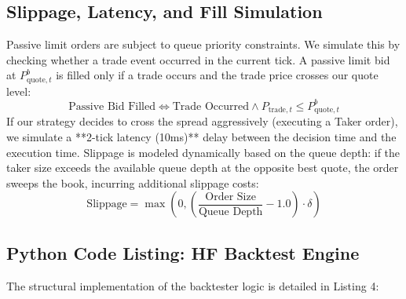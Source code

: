 \documentclass[11pt,a4paper]{article}
\begin{document}
\subsection{Slippage, Latency, and Fill Simulation}
Passive limit orders are subject to queue priority constraints. We simulate this by checking whether a trade event occurred in the current tick. A passive limit bid at $P_{\text{quote}, t}^b$ is filled only if a trade occurs and the trade price crosses our quote level:
\begin{equation}
    \text{Passive Bid Filled} \iff \text{Trade Occurred} \land P_{\text{trade}, t} \leq P_{\text{quote}, t}^b
\end{equation}
If our strategy decides to cross the spread aggressively (executing a Taker order), we simulate a **2-tick latency (10ms)** delay between the decision time and the execution time. Slippage is modeled dynamically based on the queue depth: if the taker size exceeds the available queue depth at the opposite best quote, the order sweeps the book, incurring additional slippage costs:
\begin{equation}
    \text{Slippage} = \max\left( 0, \left( \frac{\text{Order Size}}{\text{Queue Depth}} - 1.0 \right) \cdot \delta \right)
\end{equation}

\subsection{Python Code Listing: HF Backtest Engine}
The structural implementation of the backtester logic is detailed in Listing 4:
\end{document}
